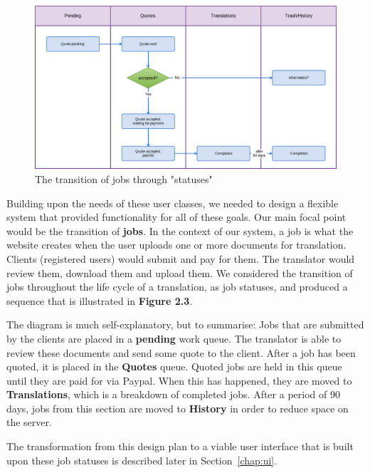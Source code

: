 \documentclass{l3proj}
\begin{document}
\begin{figure}[h]
\centering
\includegraphics[width=\linewidth]{jobstatuses}
\caption{The transition of jobs through "statuses"}
\end{figure}

Building upon the needs of these user classes, we needed to design a flexible system that provided functionality for all of these goals. Our main focal point would be the transition of \textbf{jobs}. In the context of our system, a job is what the website creates when the user uploads one or more documents for translation. Clients (registered users) would submit and pay for them. The translator would review them, download them and upload them. We considered the transition of jobs throughout the life cycle of a translation, as job statuses, and produced a sequence that is illustrated in \textbf{Figure 2.3}. \newline

The diagram is much self-explanatory, but to summarise: Jobs that are submitted by the clients are placed in a \textbf{pending} work queue. The translator is able to review these documents and send some quote to the client. After a job has been quoted, it is placed in the \textbf{Quotes} queue. Quoted jobs are held in this queue until they are paid for via Paypal. When this has happened, they are moved to \textbf{Translations}, which is a breakdown of completed jobs. After a period of 90 days, jobs from this section are moved to \textbf{History} in order to reduce space on the server.

The transformation from this design plan to a viable user interface that is built upon these job statuses is described later in Section~\ref{chap:ui}.
\newline
\end{document}
